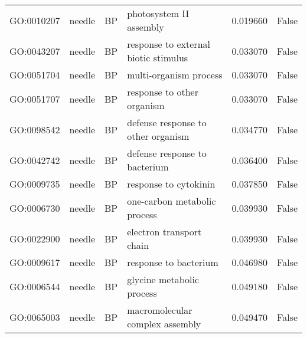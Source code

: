 \begin{longtable}{llllrl}
GO:0010207 & needle & BP &                       photosystem II assembly  & 0.019660 &   False \\
GO:0043207 & needle & BP &          response to external biotic stimulus  & 0.033070 &   False \\
GO:0051704 & needle & BP &                        multi-organism process  & 0.033070 &   False \\
GO:0051707 & needle & BP &                    response to other organism  & 0.033070 &   False \\
GO:0098542 & needle & BP &            defense response to other organism  & 0.034770 &   False \\
GO:0042742 & needle & BP &                 defense response to bacterium  & 0.036400 &   False \\
GO:0009735 & needle & BP &                         response to cytokinin  & 0.037850 &   False \\
GO:0006730 & needle & BP &                  one-carbon metabolic process  & 0.039930 &   False \\
GO:0022900 & needle & BP &                      electron transport chain  & 0.039930 &   False \\
GO:0009617 & needle & BP &                         response to bacterium  & 0.046980 &   False \\
GO:0006544 & needle & BP &                     glycine metabolic process  & 0.049180 &   False \\
GO:0065003 & needle & BP &               macromolecular complex assembly  & 0.049470 &   False \\
\bottomrule
\end{longtable}
